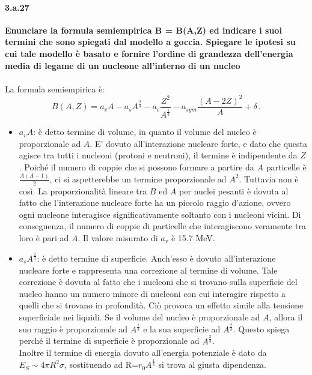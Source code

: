 \documentclass[twoside]{article}
\begin{document}
\paragraph{3.a.27}\textbf{Enunciare la formula semiempirica B = B(A,Z) ed indicare i suoi termini che
sono spiegati dal modello a goccia. Spiegare le ipotesi su cui tale modello è
basato e fornire l'ordine di grandezza dell’energia media di legame di un
nucleone all’interno di un nucleo}\\ \\
La formula semiempirica è:
\begin{equation}
B(A,Z)= a_v A-a_s A^{\frac{2}{3}}-a_c \frac{Z^2}{A^{\frac{1}{3}}} -a_{sym} \frac{(A-2Z)^2}{A}+\delta \, .
\end{equation}\label{3.a.27 semiemp}
\begin{itemize}
    \item $a_v A$: è detto termine di volume, in quanto il volume del nucleo è proporzionale ad $A$. E' dovuto all'interazione nucleare forte, e dato che questa agisce tra tutti i nucleoni (protoni e neutroni), il termine è indipendente da $Z$. Poiché il numero di coppie che si possono formare a partire da $A$ particelle è $\frac{A(A-1)}{2}$, ci si aspetterebbe un termine proporzionale ad $A^2$. Tuttavia non è così. La proporzionalità lineare tra $B$ ed $A$ per nuclei pesanti è dovuta al fatto che l'interazione nucleare forte ha un piccolo raggio d'azione, ovvero ogni nucleone interagisce significativamente soltanto con i nucleoni vicini. Di conseguenza, il numero di coppie di particelle che interagiscono veramente tra loro è pari ad $A$. Il valore misurato di $a_v$ è 15.7 MeV.
    \item $a_s A^{\frac{2}{3}}$: è detto termine di superficie. Anch'esso è dovuto all'interazione nucleare forte e rappresenta una correzione al termine di volume. Tale correzione è dovuta al fatto che i nucleoni che si trovano sulla superficie del nucleo hanno un numero minore di nucleoni con cui interagire rispetto a quelli che si trovano in profondità. Ciò provoca un effetto simile alla tensione superficiale nei liquidi. Se il volume del nucleo è proporzionale ad $A$, allora il suo raggio è proporzionale ad $A^{\frac{1}{3}}$ e la sua superficie ad $A^{\frac{2}{3}}$. Questo spiega perché il termine di superficie è proporzionale ad  $A^{\frac{2}{3}}$.\\
    Inoltre il termine di energia dovuto all'energia potenziale è dato da $E_S\sim4\pi R^2\sigma$, sostituendo ad R=$r_0A^{\frac{1}{3}}$ si trova al giusta dipendenza.\\

\end{itemize}
\end{document}
